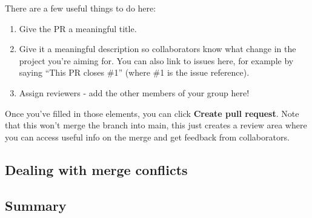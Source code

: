 \documentclass[
  12pt,
]{article}
\providecommand{\tightlist}{%
  \setlength{\itemsep}{0pt}\setlength{\parskip}{0pt}}
\begin{document}
There are a few useful things to do here:

\begin{enumerate}
\def\labelenumi{\arabic{enumi}.}
\tightlist
\item
  Give the PR a meaningful title.
\item
  Give it a meaningful description so collaborators know what change in
  the project you're aiming for. You can also link to issues here, for
  example by saying ``This PR closes \#1'' (where \#1 is the issue
  reference).
\item
  Assign reviewers - add the other members of your group here!
\end{enumerate}

Once you've filled in those elements, you can click \textbf{Create pull
request}. Note that this won't merge the branch into main, this just
creates a review area where you can access useful info on the merge and
get feedback from collaborators.

\hypertarget{dealing-with-merge-conflicts}{%
\subsection{Dealing with merge
conflicts}\label{dealing-with-merge-conflicts}}

\hypertarget{summary-1}{%
\subsection{Summary}\label{summary-1}}
\end{document}
